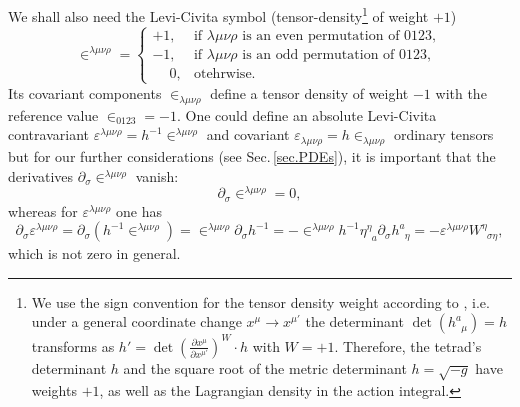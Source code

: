 \documentclass[
10pt, %
a4paper, %
oneside, %
headinclude,footinclude, %
BCOR5mm, %
]{scrartcl}
\newcommand{\pd}[1]{\partial_{#1}}
\newcommand{\tetrsymbol}{h}
\newcommand{\itetrsymbol}{\eta}
\newcommand{\itetr}[2]{\itetrsymbol^{#1}_{\phantom{#1}#2}}
\newcommand{\tetr}[2]{\tetrsymbol^{#1}_{\phantom{#1}#2}}
\newcommand{\detTetr}{\tetrsymbol}
\newcommand{\D}[1]{\partial_{#1}} %
\newcommand{\w}[2]{W^{#1}_{\phantom{#1}#2}}
\newcommand{\LCsymb}{\bm{\in}}    %
\newcommand{\LCtens}{\varepsilon} %
\begin{document}
We shall also need the Levi-Civita symbol (tensor-density\footnote{We 
	use the 
	sign convention for the tensor density weight according to \cite{Ryder2009,Grinfeld2013}, i.e.
	under a 
	general 
	coordinate change $ x^\mu \to x^{\mu'} $ the determinant $ \det(\tetr{a}{\mu}) = \detTetr $ 
	transforms as $ \detTetr' = \det \left(\frac{\partial x^\mu}{\partial x^{\mu'}} \right)^W 
	\cdot \detTetr $ with $ W=+1 $. Therefore, the tetrad's determinant $ \detTetr $ and the 
	square root of the metric determinant $ \detTetr = \sqrt{-g} $ have weights $ +1 $, as well as 
	the Lagrangian density in the action integral.} of weight $ +1 $)
\begin{equation}\label{eqn.LCsymbol.def}
	\LCsymb^{\lambda\mu\nu\rho} = 
	\left\{ 
	\begin{array}{ll}
		+1,	& \text{if \ }\lambda\mu\nu\rho \text{ is an even permutation of } 0123,\\[2mm]
		-1,	& \text{if \ }\lambda\mu\nu\rho \text{ is an odd \ permutation of } 0123,\\[2mm]
		\phantom{-}0,	& \text{otehrwise}.
	\end{array}
	\right.
\end{equation}
Its covariant components $ \LCsymb_{\lambda\mu\nu\rho} $ define a tensor density of weight $ -1 $ 
with the reference value $ \LCsymb_{0123} = -1 $. One could define an absolute 
Levi-Civita 
contravariant $ \LCtens^{\lambda\mu\nu\rho} = h^{-1} \LCsymb^{\lambda\mu\nu\rho} $ 
and covariant $ \LCtens_{\lambda\mu\nu\rho} = h \LCsymb_{\lambda\mu\nu\rho} $ ordinary tensors  
but for our further considerations (see Sec.\,\ref{sec.PDEs}), it is important that 
the derivatives $ \D{\sigma}\LCsymb^{\lambda\mu\nu\rho} $ vanish:
\begin{equation}\label{eqn.diff.LCsymb}
	\D{\sigma}\LCsymb^{\lambda\mu\nu\rho} = 0,
\end{equation}
whereas for $ \LCtens^{\lambda\mu\nu\rho} $ one has
\begin{equation}\label{eqn.diff.LeviCivita}
	\D{\sigma}\LCtens^{\lambda\mu\nu\rho} = 
	\pd{\sigma}(\detTetr^{-1}\LCsymb^{\lambda\mu\nu\rho}) = 
	\LCsymb^{\lambda\mu\nu\rho}\pd{\sigma}\detTetr^{-1} = 
	-\LCsymb^{\lambda\mu\nu\rho}\detTetr^{-1}\itetr{\eta}{a}\pd{\sigma}\tetr{a}{\eta} = 
	-\LCtens^{\lambda\mu\nu\rho}\w{\eta}{\sigma\eta},
\end{equation}
which is not zero in general.



%
\end{document}
